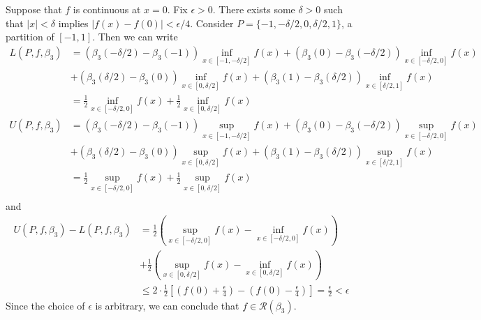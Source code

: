 \documentclass{scrartcl}
\begin{document}
Suppose that \(f\) is continuous at \(x = 0\).
Fix \(\epsilon > 0\).
There exists some \(\delta > 0\) such that \(|x| < \delta\) implies \(|f(x) - f(0)| < \epsilon / 4\).
Consider \(P = \{-1, -\delta / 2, 0, \delta / 2, 1\}\), a partition of \([-1, 1]\).
Then we can write
\begin{align*}
  L(P, f, \beta_3) &= (\beta_3(-\delta / 2) - \beta_3(-1)) \inf_{x \in [-1, -\delta / 2]} f(x) + (\beta_3(0) - \beta_3(-\delta / 2)) \inf_{x \in [-\delta / 2, 0]} f(x) \\
                   &+ (\beta_3(\delta / 2) - \beta_3(0)) \inf_{x \in [0, \delta / 2]} f(x) + (\beta_3(1) - \beta_3(\delta / 2)) \inf_{x \in [\delta / 2, 1]} f(x) \\
                   &= \frac{1}{2} \inf_{x \in [-\delta / 2, 0]} f(x) + \frac{1}{2} \inf_{x \in [0, \delta / 2]} f(x) \\
  U(P, f, \beta_3) &= (\beta_3(-\delta / 2) - \beta_3(-1)) \sup_{x \in [-1, -\delta / 2]} f(x) + (\beta_3(0) - \beta_3(-\delta / 2)) \sup_{x \in [-\delta / 2, 0]} f(x) \\
                   &+ (\beta_3(\delta / 2) - \beta_3(0)) \sup_{x \in [0, \delta / 2]} f(x) + (\beta_3(1) - \beta_3(\delta / 2)) \sup_{x \in [\delta / 2, 1]} f(x) \\
                   &= \frac{1}{2} \sup_{x \in [-\delta / 2, 0]} f(x) + \frac{1}{2} \sup_{x \in [0, \delta / 2]} f(x) \\
\end{align*}
and
\begin{align*}
  U(P, f, \beta_3) - L(P, f, \beta_3)
  &= \frac{1}{2} \left( \sup_{x \in [-\delta / 2, 0]} f(x) - \inf_{x \in [-\delta / 2, 0]} f(x) \right) \\
  &+ \frac{1}{2} \left( \sup_{x \in [0, \delta / 2]} f(x) - \inf_{x \in [0, \delta / 2]} f(x) \right) \\
  &\leq 2 \cdot \frac{1}{2} \left[ \left( f(0) + \frac{\epsilon}{4} \right) - \left( f(0) - \frac{\epsilon}{4} \right) \right]
  = \frac{\epsilon}{2}
  < \epsilon
\end{align*}
Since the choice of \(\epsilon\) is arbitrary, we can conclude that \(f \in \mathscr{R}(\beta_3)\).
\end{document}
